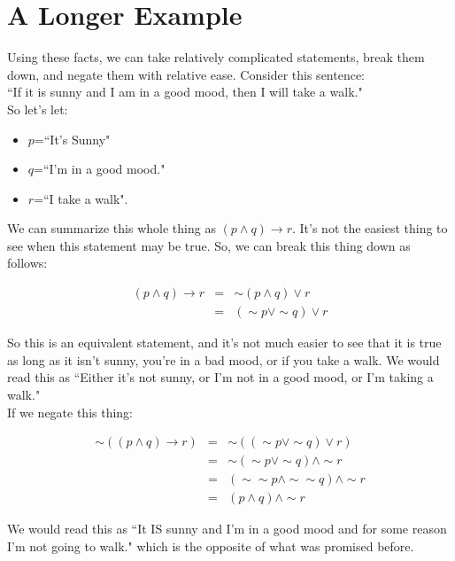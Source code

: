 \documentclass[10pt]{article}
\theoremstyle{definition}
\begin{document}
\section{A Longer Example}

Using these facts, we can take relatively complicated statements, break them down, and negate them with relative ease.  Consider this sentence:\\

``If it is sunny and I am in a good mood, then I will take a walk."\\

So let's let:

\begin{itemize}
\item $p$=``It's Sunny"
\item $q$=``I'm in a good mood."
\item $r$=``I take a walk".
\end{itemize}

We can summarize this whole thing as $(p\wedge q)\to r$.  It's not the easiest thing to see when this statement may be true.  So, we can break this thing down as follows:

\begin{eqnarray*}
(p\wedge q)\to r&=&\sim (p\wedge q)\vee r\\
&=&(\sim p \vee \sim q) \vee r
\end{eqnarray*}

So this is an equivalent statement, and it's not much easier to see that it is true as long as it isn't sunny, you're in a bad mood, or if you take a walk. We would read this as ``Either it's not sunny, or I'm not in a good mood, or I'm taking a walk." \\ 

 If we negate this thing:



\begin{eqnarray*}
\sim ((p\wedge q)\to r)&=&\sim ((\sim p \vee \sim q) \vee r)\\
&=&\sim (\sim p \vee \sim q) \wedge \sim r\\
&=& (\sim \sim p  \wedge \sim \sim q) \wedge \sim r\\
&=&(p\wedge q)\wedge \sim r
\end{eqnarray*}

We would read this as ``It IS sunny and I'm in a good mood and for some reason I'm not going to walk." which is the opposite of what was promised before.
\end{document}

